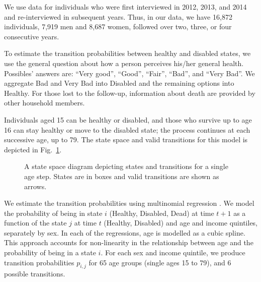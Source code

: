 \documentclass{article}
\begin{document}
We use data for individuals who were first interviewed in 2012, 2013, and 2014 and re-interviewed in subsequent years. Thus, in our data, we have 16,872 individuals, 7,919 men and 8,687 women, followed over two, three, or four consecutive years.  

To estimate the transition probabilities between healthy and disabled states, we use the general question about how a person perceives his/her general health. Possibles' answers are: ``Very good'', ``Good'', ``Fair'', ``Bad'', and ``Very Bad''. We aggregate Bad and Very Bad into Disabled and the remaining options into Healthy. For those lost to the follow-up, information about death are provided by other household members.

Individuals aged 15 can be healthy or disabled, and those who survive up to age 16 can stay healthy or move to the disabled state; the process continues at each successive age, up to 79. The state space and valid transitions for this model is depicted in Fig.~\ref{fig:statespace}.

\begin{figure}[t!]\centering
{}
\caption{A state space diagram depicting states and transitions for a single age step. States are in boxes and valid transitions are shown as arrows.}
\label{fig:statespace}
\end{figure}

We estimate the transition probabilities using multinomial regression \citep{Allison1982}. We model the probability of being in state $i$ (Healthy, Disabled, Dead) at time $t + 1$ as a function of the state $j$ at time $t$ (Healthy, Disabled) and age and income quintiles, separately by sex. In each of the regressions, age is modelled as a cubic spline. This approach accounts for non-linearity in the relationship between age and the probability of being in a state $i$. For each sex and income quintile, we produce transition probabilities $p_{i,j}$ for 65 age groups (single ages 15 to 79), and 6 possible transitions.
\end{document}
